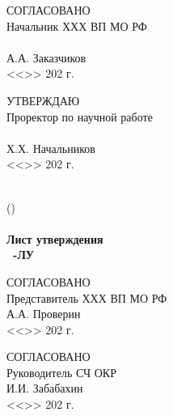 
\ifNSLHaveESKDFrame
\makeatletter
\def\@oddhead{\titleFrame}
\def\@oddfoot{}
\makeatother
\fi

\addtocounter{page}{-1}

\parbox[t]{.45\linewidth}{
	СОГЛАСОВАНО\\
	Начальник ХХХ ВП МО РФ \\
	\\
	\underline{\hspace{20mm}} А.А. Заказчиков \\
	<<\underline{\hspace{10mm}}>>  \underline{\hspace{30mm}} 202\underline{\hspace{5mm}} г.
}
\hspace{10mm}
\parbox[t]{.45\linewidth}{
	УТВЕРЖДАЮ\\
	Проректор по научной работе \\
	\orgName 	\\ 	
	\underline{\hspace{20mm}} Х.Х. Начальников \\
	<<\underline{\hspace{10mm}}>>  \underline{\hspace{30mm}} 202\underline{\hspace{5mm}} г.
}



\hfill 
\vspace{35mm}

\begin{centering}
\MakeUppercase{\devNameFull} \\
(\devName) \\
{\bfseries {\docTypeFull} \\
{Лист утверждения} \\
\decim\ \docType-ЛУ} \\
\end{centering}


\hfill 
\vspace{35mm}

\parbox[t]{.45\linewidth}{
	СОГЛАСОВАНО\\
	Представитель ХХХ ВП МО РФ \\
	\underline{\hspace{20mm}} А.А. Проверин \\
	<<\underline{\hspace{10mm}}>>  \underline{\hspace{30mm}} 202\underline{\hspace{5mm}} г.
}
\hspace{10mm}
\parbox[t]{.45\linewidth}{
	СОГЛАСОВАНО \\
	Руководитель СЧ ОКР \\
	\underline{\hspace{20mm}} И.И. Забабахин  \\
	<<\underline{\hspace{10mm}}>>  \underline{\hspace{30mm}} 202\underline{\hspace{5mm}} г.
}



